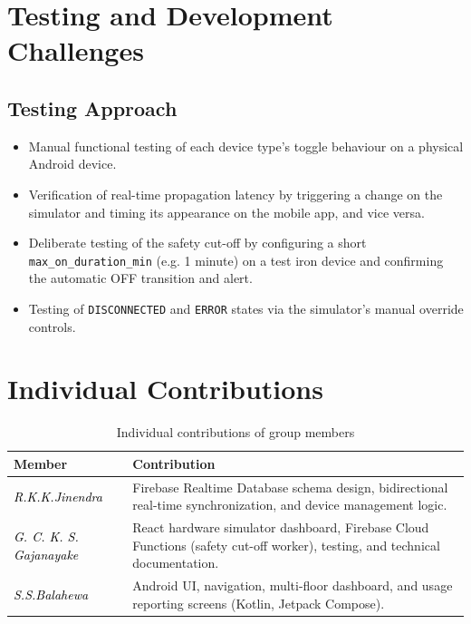 \documentclass[11pt,a4paper]{article}
\newcommand{\todofill}[1]{\textcolor{black}{\textit{#1}}}
\begin{document}
\newpage
\section{Testing and Development Challenges}

\subsection{Testing Approach}
\begin{itemize}
    \item Manual functional testing of each device type's toggle behaviour on a physical Android device.
    \item Verification of real-time propagation latency by triggering a change on the simulator and timing its appearance on the mobile app, and vice versa.
    \item Deliberate testing of the safety cut-off by configuring a short \texttt{max\_on\_duration\_min} (e.g. 1 minute) on a test iron device and confirming the automatic OFF transition and alert.
    \item Testing of \texttt{DISCONNECTED} and \texttt{ERROR} states via the simulator's manual override controls.
\end{itemize}


\newpage
\section{Individual Contributions}

\begin{table}[h!]
\centering
\begin{tabularx}{\textwidth}{lX}
\toprule
\textbf{Member} & \textbf{Contribution} \\
\midrule
\todofill{R.K.K.Jinendra} & Firebase Realtime Database schema design, bidirectional real-time synchronization, and device management logic. \\
\todofill{G. C. K. S. Gajanayake} & React hardware simulator dashboard, Firebase Cloud Functions (safety cut-off worker), testing, and technical documentation. \\
\todofill{S.S.Balahewa} & Android UI, navigation, multi-floor dashboard, and usage reporting screens (Kotlin, Jetpack Compose). \\
\bottomrule
\end{tabularx}
\caption{Individual contributions of group members}
\end{table}
\end{document}
